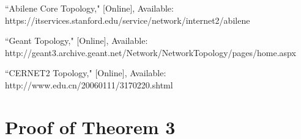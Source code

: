 \documentclass[conference]{IEEEtran}
\begin{document}
\begin{thebibliography}{1}
``Abilene Core Topology," [Online], Available:\\ https://itservices.stanford.edu/service/network/internet2/abilene

``Geant Topology," [Online], Available:\\ http://geant3.archive.geant.net/Network/NetworkTopology/pages/home.aspx

``CERNET2 Topology," [Online], Available:\\ http://www.edu.cn/20060111/3170220.shtml

\end{thebibliography}

\appendices

\section{Proof of Theorem 3}
\end{document}
